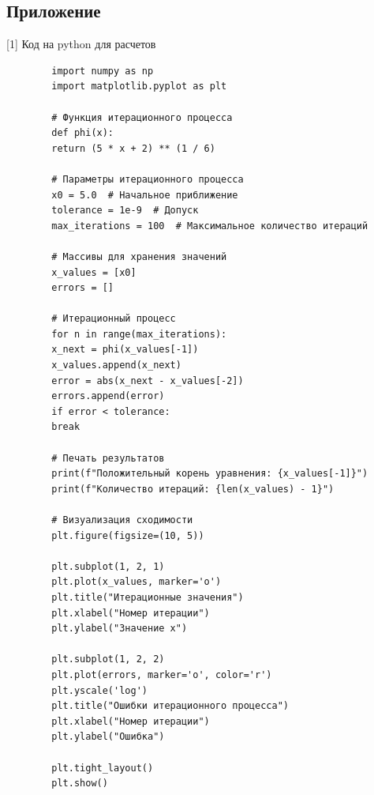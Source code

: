 \documentclass{article}
\begin{document}
	\subsection{Приложение}
	[1] Код на python для расчетов 
	\begin{verbatim}
		import numpy as np
		import matplotlib.pyplot as plt
		
		# Функция итерационного процесса
		def phi(x):
		return (5 * x + 2) ** (1 / 6)
		
		# Параметры итерационного процесса
		x0 = 5.0  # Начальное приближение
		tolerance = 1e-9  # Допуск
		max_iterations = 100  # Максимальное количество итераций
		
		# Массивы для хранения значений
		x_values = [x0]
		errors = []
		
		# Итерационный процесс
		for n in range(max_iterations):
		x_next = phi(x_values[-1])
		x_values.append(x_next)
		error = abs(x_next - x_values[-2])
		errors.append(error)
		if error < tolerance:
		break
		
		# Печать результатов
		print(f"Положительный корень уравнения: {x_values[-1]}")
		print(f"Количество итераций: {len(x_values) - 1}")
		
		# Визуализация сходимости
		plt.figure(figsize=(10, 5))
		
		plt.subplot(1, 2, 1)
		plt.plot(x_values, marker='o')
		plt.title("Итерационные значения")
		plt.xlabel("Номер итерации")
		plt.ylabel("Значение x")
		
		plt.subplot(1, 2, 2)
		plt.plot(errors, marker='o', color='r')
		plt.yscale('log')
		plt.title("Ошибки итерационного процесса")
		plt.xlabel("Номер итерации")
		plt.ylabel("Ошибка")
		
		plt.tight_layout()
		plt.show()
		
	\end{verbatim}
		
		
	
\end{document}
